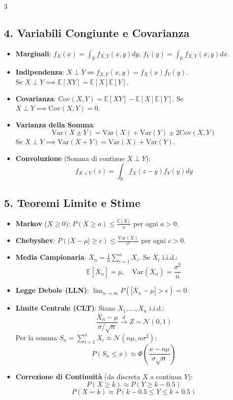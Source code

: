 \documentclass[9pt,a4paper]{article}
\begin{document}
\begin{multicols*}{3}
{\color{navy}\subsection*{4. Variabili Congiunte e Covarianza}}
\begin{itemize}
    \item \textbf{Marginali}: $f_X(x) = \int_{\mathbb{R}} f_{X,Y}(x,y)dy$, $f_Y(y) = \int_{\mathbb{R}} f_{X,Y}(x,y)dx$.
    \item \textbf{Indipendenza}: $X \perp Y \iff f_{X,Y}(x,y) = f_X(x)f_Y(y)$. \\
    Se $X \perp Y \implies \mathbb{E}[XY] = \mathbb{E}[X]\mathbb{E}[Y]$.
    \item \textbf{Covarianza}: $\text{Cov}(X,Y) = \mathbb{E}[XY] - \mathbb{E}[X]\mathbb{E}[Y]$.
    Se $X \perp Y \implies \text{Cov}(X,Y) = 0$.
    \item \textbf{Varianza della Somma}:
    \[ \text{Var}(X \pm Y) = \text{Var}(X) + \text{Var}(Y) \pm 2\text{Cov}(X,Y) \]
    Se $X \perp Y \implies \text{Var}(X+Y) = \text{Var}(X) + \text{Var}(Y)$.
    \item \textbf{Convoluzione} (Somma di continue $X \perp Y$):
    \[ f_{X+Y}(z) = \int_{\mathbb{R}} f_X(z-y)f_Y(y)dy \]
\end{itemize}

{\color{navy}\subsection*{5. Teoremi Limite e Stime}}
\begin{itemize}
    \item \textbf{Markov} ($X \ge 0$): $P(X \ge a) \le \frac{\mathbb{E}[X]}{a}$ per ogni $a > 0$.
    \item \textbf{Chebyshev}: $P(|X - \mu| \ge c) \le \frac{\text{Var}(X)}{c^2}$ per ogni $c > 0$.
    \item \textbf{Media Campionaria}: $\overline{X}_n = \frac{1}{n} \sum_{i=1}^n X_i$. Se $X_i$ i.i.d.:
    \[ \mathbb{E}[\overline{X}_n] = \mu, \quad \text{Var}(\overline{X}_n) = \frac{\sigma^2}{n} \]
    \item \textbf{Legge Debole (LLN)}: $\lim_{n\to\infty} P(|\overline{X}_n - \mu| > \epsilon) = 0$.
    \item \textbf{Limite Centrale (CLT)}: Siano $X_1, \dots, X_n$ i.i.d.:
    \[ \frac{\overline{X}_n - \mu}{\sigma/\sqrt{n}} \xrightarrow{d} Z \sim \mathcal{N}(0, 1) \]
    Per la somma $S_n = \sum_{i=1}^n X_i \approx \mathcal{N}(n\mu, n\sigma^2)$:
    \[ P(S_n \le x) \approx \Phi\left(\frac{x - n\mu}{\sigma \sqrt{n}}\right) \]
    \item \textbf{Correzione di Continuità} (da discreta $X$ a continua $Y$):
    \[ P(X \ge k) \approx P(Y \ge k - 0.5) \]
    \[ P(X = k) \approx P(k - 0.5 \le Y \le k + 0.5) \]
\end{itemize}

\end{multicols*}
\end{document}
